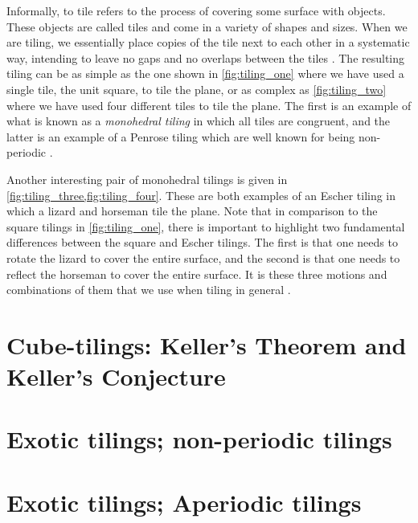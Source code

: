 \documentclass[../thesis.tex]{subfiles}
\begin{document}
Informally, to tile refers to the process of covering some surface with objects. These objects are called tiles and come in a variety of shapes and sizes. When we are tiling, we essentially place copies of the tile next to each other in a systematic way, intending to leave no gaps and no overlaps between the tiles \cite{kolountzakisTilingsTranslation2010}. The resulting tiling can be as simple as the one shown in \cref{fig:tiling_one} where we have used a single tile, the unit square, to tile the plane, or as complex as \cref{fig:tiling_two} where we have used four different tiles to tile the plane. The first is an example of what is known as a \emph{monohedral tiling} in which all tiles are congruent, and the latter is an example of a Penrose tiling which are well known for being non-periodic \cite[p. 20, 531]{grunbaumTilingsPatterns1987}. %



Another interesting pair of monohedral tilings is given in \cref{fig:tiling_three,fig:tiling_four}. These are both examples of an Escher tiling in which a lizard and horseman tile the plane. Note that in comparison to the square tilings in \cref{fig:tiling_one}, there is important to highlight two fundamental differences between the square and Escher tilings. The first is that one needs to rotate the lizard to cover the entire surface, and the second is that one needs to reflect the horseman to cover the entire surface. It is these three motions and combinations of them that we use when tiling in general \cite[p. 26]{kolountzakisTilingsTranslation2010,grunbaumTilingsPatterns1987}. 



\section{Cube-tilings: Keller's Theorem and Keller's Conjecture}
    

\section{Exotic tilings; non-periodic tilings}
    

\section{Exotic tilings; Aperiodic tilings}\label{sec:aperi_cube}
    
\end{document}
